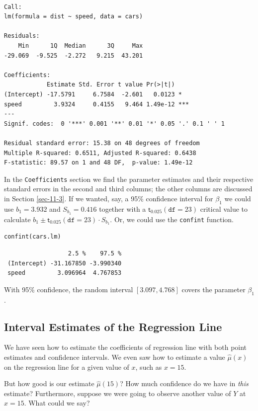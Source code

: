 \documentclass[captions=tableheading]{scrbook}
\begin{document}
\begin{verbatim}

Call:
lm(formula = dist ~ speed, data = cars)

Residuals:
    Min      1Q  Median      3Q     Max 
-29.069  -9.525  -2.272   9.215  43.201 

Coefficients:
            Estimate Std. Error t value Pr(>|t|)    
(Intercept) -17.5791     6.7584  -2.601   0.0123 *  
speed         3.9324     0.4155   9.464 1.49e-12 ***
---
Signif. codes:  0 '***' 0.001 '**' 0.01 '*' 0.05 '.' 0.1 ' ' 1 

Residual standard error: 15.38 on 48 degrees of freedom
Multiple R-squared: 0.6511,	Adjusted R-squared: 0.6438 
F-statistic: 89.57 on 1 and 48 DF,  p-value: 1.49e-12
\end{verbatim}

In the \texttt{Coefficients} section we find the parameter estimates and their respective standard errors in the second and third columns; the other columns are discussed in Section \ref{sec-11-3}. If we wanted, say, a 95\% confidence interval for \(\beta_{1}\) we could use \( b_{1} =  3.932 \) and \( S_{b_{1}} =  0.416 \) together with a \( \mathsf{t}_{0.025}(\mathtt{df}=23) \) critical value to calculate \( b_{1} \pm \mathsf{t}_{0.025}(\mathtt{df} = 23) \cdot S_{b_{1}} \).  Or, we could use the \texttt{confint} function.


\lstset{language=R}
\begin{lstlisting}
confint(cars.lm)
\end{lstlisting}

\begin{verbatim}
                  2.5 %    97.5 %
 (Intercept) -31.167850 -3.990340
 speed         3.096964  4.767853
\end{verbatim}

With 95\% confidence, the random interval \( [  3.097,  4.768 ] \) covers the parameter \(\beta_{1}\).
\subsection{Interval Estimates of the Regression Line}
\label{sec-11-2-5}
\label{sub-slr-interval-est-regline}


We have seen how to estimate the coefficients of regression line with both point estimates and confidence intervals. We even saw how to estimate a value \(\hat{\mu}(x)\) on the regression line for a given value of \(x\), such as \(x=15\). 

But how good is our estimate \(\hat{\mu}(15)\)? How much confidence do we have in \emph{this} estimate? Furthermore, suppose we were going to observe another value of \(Y\) at \(x=15\). What could we say?
\end{document}

